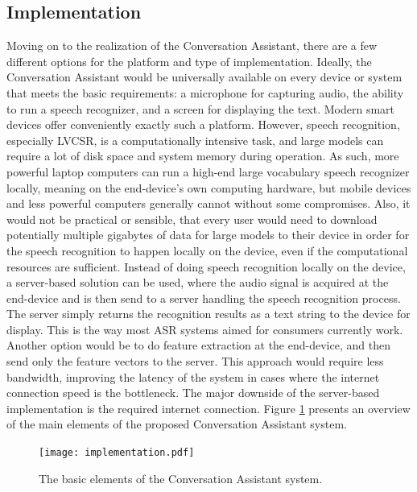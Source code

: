 \documentclass[english, 12pt, a4paper, pdftex, elec, utf8]{aaltothesis}
\begin{document}
\subsection{Implementation} \label{sec:implement}

Moving on to the realization of the Conversation Assistant, there are a few different options for the platform and type of implementation. Ideally, the Conversation Assistant would be universally available on every device or system that meets the basic requirements: a microphone for capturing audio, the ability to run a speech recognizer, and a screen for displaying the text. Modern smart devices offer conveniently exactly such a platform. However, speech recognition, especially LVCSR, is a computationally intensive task, and large models can require a lot of disk space and system memory during operation. As such, more powerful laptop computers can run a high-end large vocabulary speech recognizer locally, meaning on the end-device's own computing hardware, but mobile devices and less powerful computers generally cannot without some compromises. Also, it would not be practical or sensible, that every user would need to download potentially multiple gigabytes of data for large models to their device in order for the speech recognition to happen locally on the device, even if the computational resources are sufficient. Instead of doing speech recognition locally on the device, a server-based solution can be used, where the audio signal is acquired at the end-device and is then send to a server handling the speech recognition process. The server simply returns the recognition results as a text string to the device for display. This is the way most ASR systems aimed for consumers currently work. Another option would be to do feature extraction at the end-device, and then send only the feature vectors to the server. This approach would require less bandwidth, improving the latency of the system in cases where the internet connection speed is the bottleneck. The major downside of the server-based implementation is the required internet connection. Figure \ref{fig:system} presents an overview of the main elements of the proposed Conversation Assistant system. \\
\begin{figure}[h]
	\centering
	\texttt{[image: implementation.pdf]}
	\caption{The basic elements of the Conversation Assistant system.}
	\label{fig:system} 
\end{figure} \\
\end{document}
